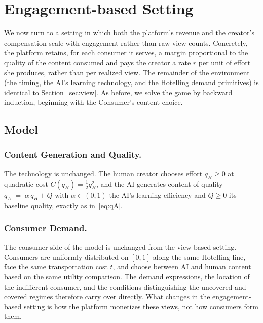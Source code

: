 
\section{Engagement-based Setting}\label{sec:eng}

We now turn to a setting in which both the platform's revenue and the
creator's compensation scale with engagement rather than raw view
counts. Concretely, the platform retains, for each consumer it serves,
a margin proportional to the quality of the content consumed and pays the creator a rate
$r$ per unit of effort she produces, rather than per realized view. The remainder of the environment (the timing, the AI's learning
technology, and the Hotelling demand primitives) is identical to
Section~\ref{sec:view}. As before, we solve the game by backward
induction, beginning with the Consumer's content choice.

\subsection{Model}

\subsubsection*{Content Generation and Quality.}

The technology is unchanged. The human creator chooses effort
$q_H \geq 0$ at quadratic cost $C(q_H) = \tfrac{1}{2}q_H^{2}$, and the
AI generates content of quality $
q_A \;=\; \alpha\, q_H + Q $
with $\alpha \in (0,1)$ the AI's learning efficiency and $Q \geq 0$ its
baseline quality, exactly as in~\eqref{eq:qA}.

\subsubsection*{Consumer Demand.}

The consumer side of the model is unchanged from the view-based setting. Consumers are uniformly distributed on $[0,1]$ along the same Hotelling line, face the same transportation cost $t$, and choose between AI and human content based on the same utility comparison. The demand expressions, the location of the indifferent consumer, and the conditions distinguishing the uncovered and covered regimes therefore carry over directly. What changes in the engagement-based setting is how the platform monetizes these views, not how consumers form them.

